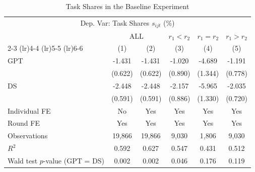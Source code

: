 \begin{table}[H]
\centering
\caption{Task Shares in the Baseline Experiment}
\footnotesize
\begin{threeparttable}
\begin{tabular}{l*{5}{c}}
\toprule\toprule
\multicolumn{6}{c}{Dep. Var: Task Shares $s_{ijt}$ (\%)} \\
 & \multicolumn{2}{c}{ALL} & \multicolumn{1}{c}{$r_1 < r_2$} & \multicolumn{1}{c}{$r_1 = r_2$} & \multicolumn{1}{c}{$r_1 > r_2$} \\
\cmidrule(lr){2-3} \cmidrule(lr){4-4} \cmidrule(lr){5-5} \cmidrule(lr){6-6}
            &\multicolumn{1}{c}{(1)}         &\multicolumn{1}{c}{(2)}         &\multicolumn{1}{c}{(3)}         &\multicolumn{1}{c}{(4)}         &\multicolumn{1}{c}{(5)}         \\
\midrule
GPT         &      -1.431\sym{**} &      -1.431\sym{**} &      -1.020         &      -4.689\sym{***}&      -1.191         \\
            &     (0.622)         &     (0.622)         &     (0.890)         &     (1.344)         &     (0.778)         \\
\addlinespace
DS          &      -2.448\sym{***}&      -2.448\sym{***}&      -2.157\sym{**} &      -5.965\sym{***}&      -2.035\sym{***}\\
            &     (0.591)         &     (0.591)         &     (0.886)         &     (1.330)         &     (0.720)         \\
\midrule
Individual FE&          No         &         Yes         &         Yes         &         Yes         &         Yes         \\
Round FE    &         Yes         &         Yes         &         Yes         &         Yes         &         Yes         \\
Observations&      19,866         &      19,866         &       9,030         &       1,806         &       9,030         \\
$R^2$       &       0.592         &       0.627         &       0.547         &       0.431         &       0.512         \\
Wald test $p$-value (GPT = DS)&       0.002         &       0.002         &       0.046         &       0.176         &       0.119         \\
\bottomrule\bottomrule
\end{tabular}
\end{threeparttable}
\end{table}
